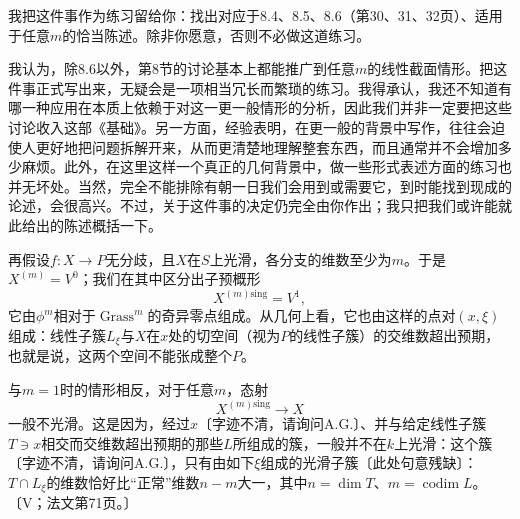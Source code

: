 我把这件事作为练习留给你：找出对应于8.4、8.5、8.6（第30、31、32页）、适用于任意$m$的恰当陈述。除非你愿意，否则不必做这道练习。

我认为，除8.6以外，第8节的讨论基本上都能推广到任意$m$的线性截面情形。把这件事正式写出来，无疑会是一项相当冗长而繁琐的练习。我得承认，我还不知道有哪一种应用在本质上依赖于对这一更一般情形的分析，因此我们并非一定要把这些讨论收入这部《基础》。另一方面，经验表明，在更一般的背景中写作，往往会迫使人更好地把问题拆解开来，从而更清楚地理解整套东西，而且通常并不会增加多少麻烦。此外，在这里这样一个真正的几何背景中，做一些形式表述方面的练习也并无坏处。当然，完全不能排除有朝一日我们会用到或需要它，到时能找到现成的论述，会很高兴。不过，关于这件事的决定仍完全由你作出；我只把我们或许能就此给出的陈述概括一下。


再假设$f\colon X\to P$无分歧，且$X$在$S$上光滑，各分支的维数至少为$m$。于是$X^{(m)}=V^0$；我们在其中区分出子预概形
\[
X^{(m)\mathrm{sing}}=V^1,
\]
它由$\phi^m$相对于$\operatorname{Grass}^m$的奇异零点组成。从几何上看，它也由这样的点对$(x,\xi)$组成：线性子簇$L_\xi$与$X$在$x$处的切空间（视为$P$的线性子簇）的交维数超出预期，也就是说，这两个空间不能张成整个$P$。

与$m=1$时的情形相反，对于任意$m$，态射
\[
X^{(m)\mathrm{sing}}\longrightarrow X
\]
一般不光滑。这是因为，经过$x$〔字迹不清，请询问A.G.〕、并与给定线性子簇$T\ni x$相交而交维数超出预期的那些$L$所组成的簇，一般并不在$k$上光滑：这个簇〔字迹不清，请询问A.G.〕，只有由如下$\xi$组成的光滑子簇〔此处句意残缺〕：$T\cap L_\xi$的维数恰好比“正常”维数$n-m$大一，其中$n=\dim T$、$m=\operatorname{codim}L$。〔V；法文第71页。〕


